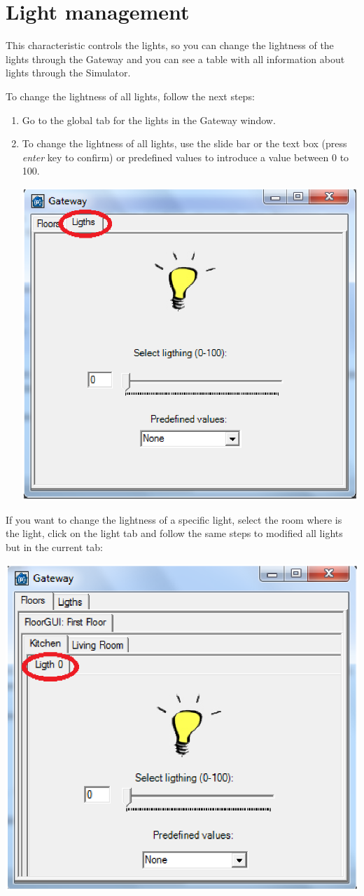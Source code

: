 \section{Light management}
This characteristic controls the lights, so you can change the lightness of the lights through the Gateway and you can see a table with all information about lights through the Simulator.

To change the lightness of all lights, follow the next steps:
\begin{enumerate}
\item Go to the global tab for the lights in the Gateway window.

\item To change the lightness of all lights, use the slide bar or the text box (press \emph{enter} key to confirm) or predefined values to introduce a value between 0 to 100.
\begin{center}
	\includegraphics[width=.68\linewidth]{images/globalLight.eps}
	\\
\vspace{1cm}
\end{center}


\end{enumerate}
If you want to change the lightness of a specific light, select the room where is the light, click on the light tab and follow the same steps to modified all lights but in the current tab:
\begin{center}
	\includegraphics[width=.68\linewidth]{images/specificLight.eps}
	\\
\vspace{1cm}
\end{center}

